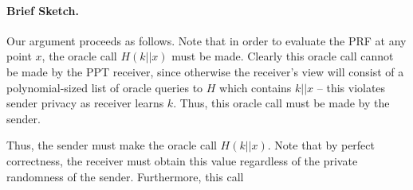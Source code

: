 \documentclass[10pt,a4paper]{article}
\begin{document}
\paragraph{Brief Sketch.} Our argument proceeds as follows. Note that in order to evaluate the PRF at any point $x$, the oracle call $H(k||x)$ must be made. Clearly this oracle call cannot be made by the PPT receiver, since otherwise the receiver's view will consist of a polynomial-sized list of oracle queries to $H$ which contains $k||x$ -- this violates sender privacy as receiver learns $k$. Thus, this oracle call must be made by the sender.

Thus, the sender must make the oracle call $H(k||x)$. Note that by perfect correctness, the receiver must obtain this value regardless of the private randomness of the sender. Furthermore, this call 


%	
%	
	
\end{document}
